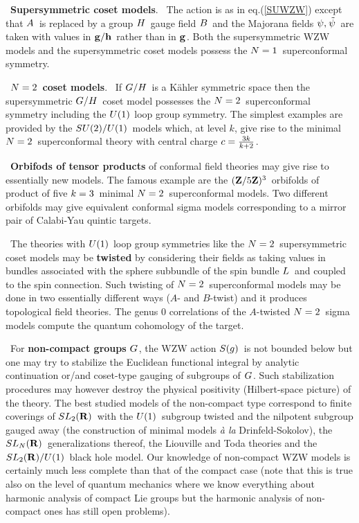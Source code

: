  \ {\bf Supersymmetric coset models}. \ The action
is as in eq.\s\s(\ref{SUWZW}) except that \s$A\hspace{0.05cm}$ is replaced by
a group \s$H\hspace{0.05cm}$ gauge field \s$B\hspace{0.05cm}$ and the Majorana fields
\s$\psi,\hspace{0.025cm}\tilde\psi\hspace{0.05cm}$ are taken with values in \s${\bf g}/{\bf h}\hspace{0.05cm}$
rather than in \s${\bf g}\hspace{0.025cm}$.
Both the supersymmetric WZW models and the supersymmetric
coset models possess the \s$N=1\hspace{0.05cm}$ superconformal symmetry.
\vskip 0.4cm

 \ $N=2\hspace{0.05cm}$ {\bf coset models}. \ If
\s$G/H\hspace{0.05cm}$ is a K\"{a}hler symmetric space then the supersymmetric
\s$G/H\hspace{0.05cm}$ coset model possesses the \s$N=2\hspace{0.05cm}$ superconformal
symmetry including the \m$U(1)\hspace{0.025cm}$ loop group symmetry.
The simplest examples are provided by the
\s$SU(2)/U(1)\hspace{0.05cm}$ models which, at level \m$k$, \s give
rise to the minimal \s$N=2\hspace{0.05cm}$ superconformal theory with
central charge \s$c={{3k}\over{k+2}}\hspace{0.025cm}$.
\vskip 0.4cm

 \ {\bf Orbifods of tensor products} of conformal
field theories may give rise to essentially new models.
The famous example are the \s$({{\bf Z}}/5{{\bf Z}})^3\hspace{0.05cm}$ orbifolds
of product of five \s$k=3\hspace{0.05cm}$ minimal \s$N=2\hspace{0.05cm}$ superconformal
models. Two different orbifolds may give equivalent conformal
sigma models corresponding to a mirror pair of Calabi-Yau
quintic targets.
\vskip 0.4cm

 \ The theories with \m$U(1)\hspace{0.025cm}$ loop group symmetries
like the \s$N=2\hspace{0.05cm}$ supersymmetric coset models may be
{\bf twisted} by considering their fields as taking values
in bundles associated with the sphere subbundle of the spin
bundle \s$L\hspace{0.05cm}$ and coupled to the spin connection. Such
twisting of \s$N=2\hspace{0.05cm}$ superconformal models may be done in two
essentially different ways ($A$- and $B$-twist) and it produces
topological field theories. The genus 0 correlations
of the \s$A$-twisted \s$N=2\hspace{0.05cm}$ sigma models compute
the quantum cohomology of the target.
\vskip 0.4cm

 \ For {\bf non-compact groups} \s$G\hspace{0.025cm}$, \m the WZW
action \s$S(g)\hspace{0.05cm}$ is not bounded below but one may try
to stabilize the Euclidean functional integral by
analytic continuation or/and coset-type gauging of subgroups
of \s$G\hspace{0.025cm}$. \m Such stabilization procedures may however destroy
the physical positivity (Hilbert-space picture) of the theory.
The best studied models of the non-compact type correspond
to finite coverings of \s$SL_2({{\bf R}})\hspace{0.05cm}$ with the \s$U(1)\hspace{0.05cm}$
subgroup twisted and the nilpotent subgroup gauged away
(the construction of minimal models {\it \`{a} la} Drinfeld-Sokolov),
the \s$SL_N({{\bf R}})\hspace{0.05cm}$ generalizations
thereof, the Liouville and Toda theories
and the \s$SL_2({{\bf R}})/U(1)\hspace{0.05cm}$ black hole model.
Our knowledge of non-compact WZW models
is certainly much less complete than that of the compact
case (note that this is true also on the level of quantum
mechanics where we know everything about harmonic analysis
of compact Lie groups but the harmonic analysis of non-compact
ones has still open problems).
\vskip 0.8cm


